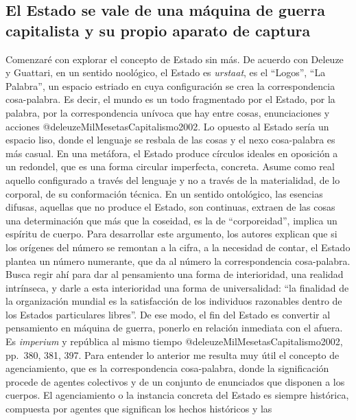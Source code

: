 \documentclass[
]{article}
\begin{document}
\hypertarget{el-estado-se-vale-de-una-muxe1quina-de-guerra-capitalista-y-su-propio-aparato-de-captura}{%
\subsection{El Estado se vale de una máquina de guerra capitalista y su
propio aparato de
captura}\label{el-estado-se-vale-de-una-muxe1quina-de-guerra-capitalista-y-su-propio-aparato-de-captura}}

Comenzaré con explorar el concepto de Estado sin más. De acuerdo con
Deleuze y Guattari, en un sentido noológico, el Estado es
\emph{urstaat}, es el ``Logos'', ``La Palabra'', un espacio estriado en
cuya configuración se crea la correspondencia cosa-palabra. Es decir, el
mundo es un todo fragmentado por el Estado, por la palabra, por la
correspondencia unívoca que hay entre cosas, enunciaciones y acciones
@deleuzeMilMesetasCapitalismo2002. Lo opuesto al Estado sería un espacio
liso, donde el lenguaje se resbala de las cosas y el nexo cosa-palabra
es más casual. En una metáfora, el Estado produce círculos ideales en
oposición a un redondel, que es una forma circular imperfecta, concreta.
Asume como real aquello configurado a través del lenguaje y no a través
de la materialidad, de lo corporal, de su conformación técnica. En un
sentido ontológico, las esencias difusas, aquellas que no produce el
Estado, son continuas, extraen de las cosas una determinación que más
que la coseidad, es la de ``corporeidad'', implica un espíritu de
cuerpo. Para desarrollar este argumento, los autores explican que si los
orígenes del número se remontan a la cifra, a la necesidad de contar, el
Estado plantea un número numerante, que da al número la correspondencia
cosa-palabra. Busca regir ahí para dar al pensamiento una forma de
interioridad, una realidad intrínseca, y darle a esta interioridad una
forma de universalidad: ``la finalidad de la organización mundial es la
satisfacción de los individuos razonables dentro de los Estados
particulares libres''. De ese modo, el fin del Estado es convertir al
pensamiento en máquina de guerra, ponerlo en relación inmediata con el
afuera. Es \emph{imperium} y república al mismo tiempo
@deleuzeMilMesetasCapitalismo2002, pp.~380, 381, 397. Para entender lo
anterior me resulta muy útil el concepto de agenciamiento, que es la
correspondencia cosa-palabra, donde la significación procede de agentes
colectivos y de un conjunto de enunciados que disponen a los cuerpos. El
agenciamiento o la instancia concreta del Estado es siempre histórica,
compuesta por agentes que significan los hechos históricos y las
\end{document}
